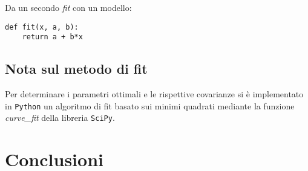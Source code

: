 \documentclass{article}[a4paper, 12pt, italian]
\begin{document}
Da un secondo \emph{fit} con un modello:
\begin{lstlisting}
def fit(x, a, b):
    return a + b*x
\end{lstlisting}
%

\subsection{Nota sul metodo di fit}
Per determinare i parametri ottimali e le rispettive covarianze si \`e
implementato in \verb+Python+ un algoritmo di fit basato sui minimi quadrati
mediante la funzione \emph{curve\_fit} della libreria 
\texttt{SciPy}\cite{scipy}.
\section{Conclusioni}


\end{document}
